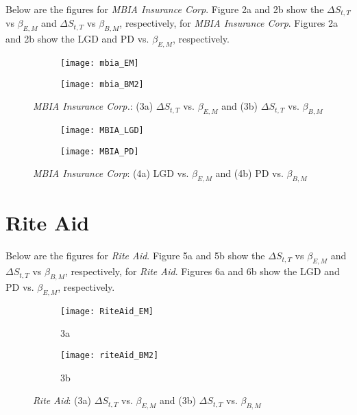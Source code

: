 \documentclass[12pt, two-sided]{article}
\begin{document}
Below are the figures for \emph{MBIA Insurance Corp}. Figure 2a and 2b show the $\Delta S_{t,T}$ vs $\beta_{E,M}$  and $\Delta S_{t,T}$ vs $\beta_{B,M}$, respectively, for \emph{MBIA Insurance Corp}. Figures 2a and 2b show the LGD and PD vs. $\beta_{E,M}$, respectively. 

\begin{figure}[H]
\begin{subfigure}{.5\textwidth}
  \centering
  \texttt{[image: mbia\_EM]}
  \caption{}
\end{subfigure}
\begin{subfigure}{.5\textwidth}
  \centering
  \texttt{[image: mbia\_BM2]}
  \caption{}
\end{subfigure}
\caption{\emph{MBIA Insurance Corp.}: (3a)  $\Delta S_{t,T}$ vs. $\beta_{E,M}$
			  and (3b)  $\Delta S_{t,T}$ vs. $\beta_{B,M}$}
\label{fig:fig}
\end{figure}

\begin{figure}[H]
\begin{subfigure}{0.5\textwidth}
  \centering
  \texttt{[image: MBIA\_LGD]}
  \caption{}
\end{subfigure}%
\begin{subfigure}{.5\textwidth}
  \centering
  \texttt{[image: MBIA\_PD]}
  \caption{}
\end{subfigure}
\caption{\emph{MBIA Insurance Corp}: (4a)  LGD vs. $\beta_{E,M}$
			  and (4b) PD vs. $\beta_{B,M}$}
\end{figure}

\section{Rite Aid}

Below are the figures for \emph{Rite Aid}. Figure 5a and 5b show the $\Delta S_{t,T}$ vs $\beta_{E,M}$  and $\Delta S_{t,T}$ vs $\beta_{B,M}$, respectively, for \emph{Rite Aid}. Figures 6a and 6b show the LGD and PD vs. $\beta_{E,M}$, respectively. 

\begin{figure}[H]
\begin{subfigure}{.5\textwidth}
  \centering
  \texttt{[image: RiteAid\_EM]}
  \caption{3a}
\end{subfigure}
\begin{subfigure}{.5\textwidth}
  \centering
  \texttt{[image: riteAid\_BM2]}
  \caption{3b}
\end{subfigure}
\caption{\emph{Rite Aid}: (3a)  $\Delta S_{t,T}$ vs. $\beta_{E,M}$
			  and (3b)  $\Delta S_{t,T}$ vs. $\beta_{B,M}$}
\label{fig:fig}
\end{figure}
\end{document}
